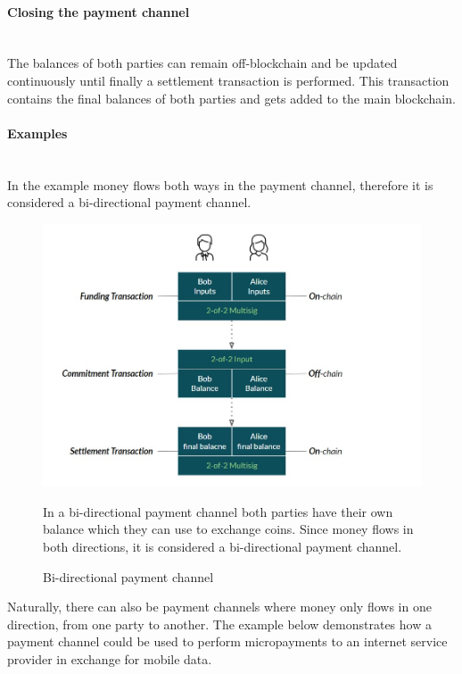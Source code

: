 \documentclass[a4paper, 12pt]{report}
\begin{document}
\paragraph{Closing the payment channel} \hspace{0pt} \\
The balances of both parties can remain off-blockchain and be updated continuously until finally a settlement transaction is performed. This transaction contains the final balances of both parties and gets added to the main blockchain.

\paragraph{Examples} \hspace{0pt} \\
In the example money flows both ways in the payment channel, therefore it is considered a bi-directional payment channel.

\begin{figure}[H]
	\centering
	\includegraphics[width=13cm]{04_Bidirectional_Channel}
	\caption{Bi-directional payment channel}
	\medskip
	\small In a bi-directional payment channel both parties have their own balance which they can use to exchange coins. Since money flows in both directions, it is considered a bi-directional payment channel.
	\label{fig:04_Bidirectional_Channel}
\end{figure}

\par Naturally, there can also be payment channels where money only flows in one direction, from one party to another. The example below demonstrates how a payment channel could be used to perform micropayments to an internet service provider in exchange for mobile data.
\end{document}

